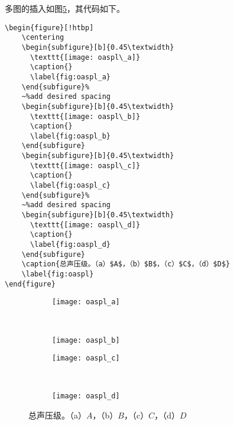 多图的插入如图\ref{fig:oaspl}，其代码如下。
\begin{verbatim}
\begin{figure}[!htbp]
    \centering
    \begin{subfigure}[b]{0.45\textwidth}
      \texttt{[image: oaspl\_a]}
      \caption{}
      \label{fig:oaspl_a}
    \end{subfigure}%
    ~%add desired spacing
    \begin{subfigure}[b]{0.45\textwidth}
      \texttt{[image: oaspl\_b]}
      \caption{}
      \label{fig:oaspl_b}
    \end{subfigure}
    \begin{subfigure}[b]{0.45\textwidth}
      \texttt{[image: oaspl\_c]}
      \caption{}
      \label{fig:oaspl_c}
    \end{subfigure}%
    ~%add desired spacing
    \begin{subfigure}[b]{0.45\textwidth}
      \texttt{[image: oaspl\_d]}
      \caption{}
      \label{fig:oaspl_d}
    \end{subfigure}
    \caption{总声压级。（a）$A$，（b）$B$，（c）$C$，（d）$D$}
    \label{fig:oaspl}
\end{figure}
\end{verbatim}
\begin{figure}[!htbp]
    \centering
    \begin{subfigure}[b]{0.45\textwidth}
      \texttt{[image: oaspl\_a]}
      \caption{}
      \label{fig:oaspl_a}
    \end{subfigure}%
    ~%
    \begin{subfigure}[b]{0.45\textwidth}
      \texttt{[image: oaspl\_b]}
      \caption{}
      \label{fig:oaspl_b}
    \end{subfigure}
    \begin{subfigure}[b]{0.45\textwidth}
      \texttt{[image: oaspl\_c]}
      \caption{}
      \label{fig:oaspl_c}
    \end{subfigure}%
    ~%
    \begin{subfigure}[b]{0.45\textwidth}
      \texttt{[image: oaspl\_d]}
      \caption{}
      \label{fig:oaspl_d}
    \end{subfigure}
    \caption{总声压级。（a）$A$，（b）$B$，（c）$C$，（d）$D$}
    \label{fig:oaspl}
\end{figure}

